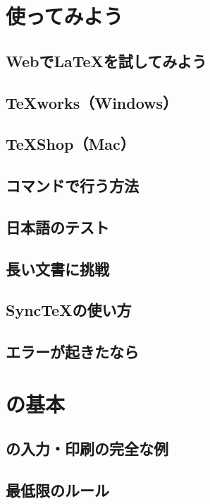 \documentclass{jsbook}
\begin{document}
\chapter{使ってみよう}

\section{Webで\LaTeX を試してみよう}

\section{TeXworks（Windows）}

\section{TeXShop（Mac）}

\section{コマンドで行う方法}

\section{日本語のテスト}

\section{長い文書に挑戦}

\section{Sync\TeX の使い方}

\section{エラーが起きたなら}

\chapter{\LaTeXe の基本}

\section{\LaTeXe の入力・印刷の完全な例}

\section{最低限のルール}
\end{document}
